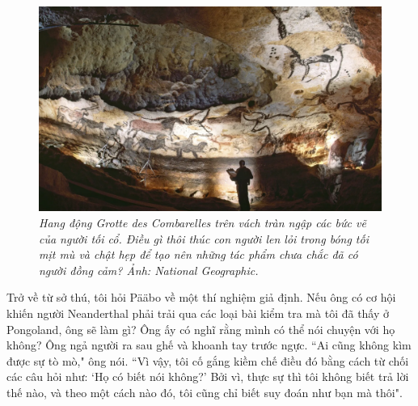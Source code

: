 \begin{multicols}{2}
	\begin{figure}[H]
		\vspace*{-5pt}
		\centering
		\captionsetup{labelformat= empty, justification=centering}
		\includegraphics[width= 1\linewidth]{5}
		\caption{\small\textit{\color{timhieukhoahoc}Hang động Grotte des Combarelles trên vách tràn ngập các bức vẽ của người tối cổ. Điều gì thôi thúc con người len lỏi trong bóng tối mịt mù và chật hẹp để tạo nên những tác phẩm chưa chắc đã có người đồng cảm? Ảnh: National Geographic.}}
		\vspace*{-10pt}
	\end{figure}
	Trở về từ sở thú, tôi hỏi Pääbo về một thí nghiệm giả định. Nếu ông có cơ hội khiến người Neanderthal phải trải qua các loại bài kiểm tra mà tôi đã thấy ở Pongoland, ông sẽ làm gì? Ông ấy có nghĩ rằng mình có thể nói chuyện với họ không? Ông ngả người ra sau ghế và khoanh tay trước ngực.
	\vskip 0.1cm
	``Ai cũng không kìm được sự tò mò," ông nói. ``Vì vậy, tôi cố gắng kiềm chế điều đó bằng cách từ chối các câu hỏi như: ‘Họ có biết nói không?’ Bởi vì, thực sự thì tôi không biết trả lời thế nào, và theo một cách nào đó, tôi cũng chỉ biết suy đoán như bạn mà thôi".
	\vskip 0.1cm

\end{multicols}
